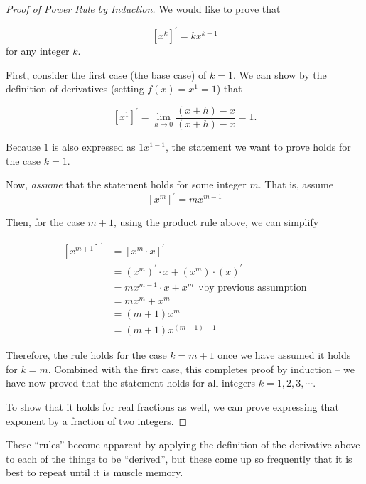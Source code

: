 \documentclass[
]{book}
\theoremstyle{definition}
\theoremstyle{definition}
\theoremstyle{definition}
\theoremstyle{remark}
\begin{document}
\begin{proof}[Proof of Power Rule by Induction]
{}
We would like to prove that

\[\left[x^k\right]^\prime = k x^{k-1}\]
for any integer \(k\).

First, consider the first case (the base case) of \(k = 1\). We can show by the definition of derivatives (setting \(f(x) = x^1 = 1\)) that

\[[x^1]^\prime = \lim_{h \rightarrow 0}\frac{(x + h) - x}{(x + h) - x}= 1.\]

Because \(1\) is also expressed as \(1 x^{1- 1}\), the statement we want to prove holds for the case \(k =1\).

Now, \emph{assume} that the statement holds for some integer \(m\). That is, assume
\[\left[x^m\right]^\prime = m x^{m-1}\]

Then, for the case \(m + 1\), using the product rule above, we can simplify

\begin{align*}
\left[x^{m + 1}\right]^\prime &= [x^{m}\cdot x]^\prime\\
&= (x^m)^\prime\cdot x + (x^m)\cdot (x)^\prime\\
&= m x^{m - 1}\cdot x + x^m ~~\because \text{by previous assumption}\\
&= mx^m + x^m\\
&= (m + 1)x^m\\
&= (m + 1)x^{(m + 1) - 1}
\end{align*}

Therefore, the rule holds for the case \(k = m + 1\) once we have assumed it holds for \(k = m\). Combined with the first case, this completes proof by induction -- we have now proved that the statement holds for all integers \(k = 1, 2, 3, \cdots\).

To show that it holds for real fractions as well, we can prove expressing that exponent by a fraction of two integers.
\end{proof}

These ``rules'' become apparent by applying the definition of the derivative above to each of the things to be ``derived'', but these come up so frequently that it is best to repeat until it is muscle memory.
\end{document}
